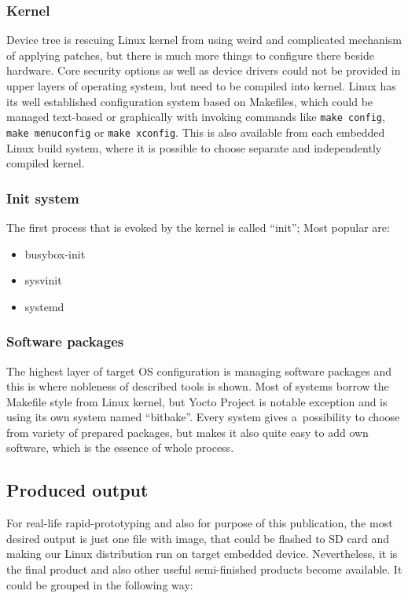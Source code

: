 \documentclass[printmode]{mgr}
\begin{document}
\subsubsection{Kernel}
Device tree is rescuing Linux kernel from using weird and complicated mechanism of applying patches, but there is much more things to configure there beside hardware. Core security options as well as device drivers could not be provided in upper layers of operating system, but need to be compiled into kernel. Linux has its well established configuration system based on Makefiles, which could be managed text-based or graphically with invoking commands like \verb|make config|, \verb|make menuconfig| or \verb|make xconfig|. This is also available from each embedded Linux build system, where it is possible to choose separate and independently compiled kernel.

\subsubsection{Init system}

The first process that is evoked by the kernel is called ``init''; Most popular are:

\begin{itemize}
    \item busybox-init
    \item sysvinit
    \item systemd
\end{itemize}

\subsubsection{Software packages}
The highest layer of target OS configuration is managing software packages and this is where nobleness of described tools is shown. Most of systems borrow the Makefile style from Linux kernel, but Yocto Project is notable exception and is using its own system named ``bitbake''. Every system gives a~possibility to choose from variety of prepared packages, but makes it also quite easy to add own software, which is the essence of whole process.

\subsection{Produced output}

For real-life rapid-prototyping and also for purpose of this publication, the most desired output is just one file with image, that could be flashed to SD card and making our Linux distribution run on target embedded device. Nevertheless, it is the final product and also other useful semi-finished products become available. It could be grouped in the following way:
\end{document}

